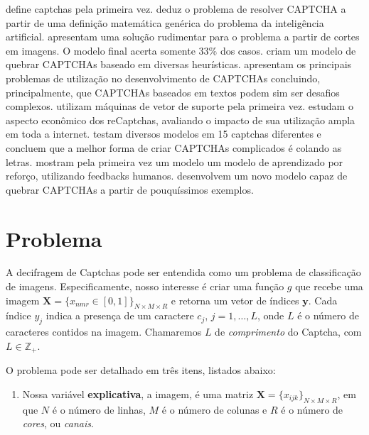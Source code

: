 \documentclass[12pt,]{report}
\providecommand{\tightlist}{%
  \setlength{\itemsep}{0pt}\setlength{\parskip}{0pt}}
\begin{document}
\citep{von2002telling} define captchas pela primeira vez. \citet{von2003captcha} deduz o problema de resolver CAPTCHA a partir de uma definição matemática genérica do problema da inteligência artificial. \citet{mori2003recognizing} apresentam uma solução rudimentar para o problema a partir de cortes em imagens. O modelo final acerta somente 33\% dos casos. \citet{yan2008low} criam um modelo de quebrar CAPTCHAs baseado em diversas heurísticas. \citet{yan2008usability} apresentam os principais problemas de utilização no desenvolvimento de CAPTCHAs concluindo, principalmente, que CAPTCHAs baseados em textos podem sim ser desafios complexos. \citet{golle2008machine} utilizam máquinas de vetor de suporte pela primeira vez. \citet{motoyama2010re} estudam o aspecto econômico dos reCaptchas, avaliando o impacto de sua utilização ampla em toda a internet. \citet{bursztein2011text} testam diversos modelos em 15 captchas diferentes e concluem que a melhor forma de criar CAPTCHAs complicados é colando as letras. \citet{bursztein2014end} mostram pela primeira vez um modelo um modelo de aprendizado por reforço, utilizando feedbacks humanos. \citet{george2017generative} desenvolvem um novo modelo capaz de quebrar CAPTCHAs a partir de pouquíssimos exemplos.

\hypertarget{problema}{%
\chapter{Problema}\label{problema}}

A decifragem de Captchas pode ser entendida como um problema de classificação de imagens. Especificamente, nosso interesse é criar uma função \(g\) que recebe uma imagem \(\mathbf X = \{x_{nmr} \in [0,1]\}_{N\times M \times R}\) e retorna um vetor de índices \(\mathbf y\). Cada índice \(y_j\) indica a presença de um caractere \(c_j\), \(j = 1, \dots, L\), onde \(L\) é o número de caracteres contidos na imagem. Chamaremos \(L\) de \emph{comprimento} do Captcha, com \(L \in \mathbb{Z}_+\).

O problema pode ser detalhado em três itens, listados abaixo:

\begin{enumerate}
\def\labelenumi{\arabic{enumi}.}
\tightlist
\item
  Nossa variável \textbf{explicativa}, a imagem, é uma matriz \(\mathbf X = \{x_{ijk}\}_{N\times M \times R}\), em que \(N\) é o número de linhas, \(M\) é o número de colunas e \(R\) é o número de \emph{cores}, ou \emph{canais}.
\end{enumerate}
\end{document}
